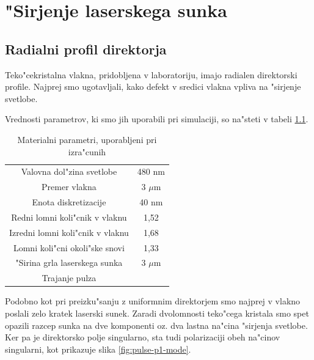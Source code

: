 \documentclass[12pt,twoside,openright,final]{report}
\begin{document}
\chapter{"Sirjenje laserskega sunka}

\section{Radialni profil direktorja}

Teko"cekristalna vlakna, pridobljena v laboratoriju, imajo radialen direktorski profile. 
Najprej smo ugotavljali, kako defekt v sredici vlakna vpliva na "sirjenje svetlobe. 

Vrednosti parametrov, ki smo jih uporabili pri simulaciji, so na"steti v tabeli \ref{tab:parametri}. 

\begin{table}[!htbp]
\centering
 \begin{tabular}{|c|c|}
  \hline
  Valovna dol"zina svetlobe & 480 nm \\
  Premer vlakna & 3 $\mu$m \\
  Enota diskretizacije & 40 nm \\
  \hline
  Redni lomni koli"cnik v vlaknu & 1,52 \\
  Izredni lomni koli"cnik v vlaknu & 1,68 \\
  Lomni koli"cni okoli"ske snovi & 1,33 \\
  \hline
  "Sirina grla laserskega sunka & 3 $\mu$m \\
  Trajanje pulza & \\
  \hline
 \end{tabular}
 \caption{Materialni parametri, uporabljeni pri izra"cunih}
 \label{tab:parametri}
\end{table}

Podobno kot pri preizku"sanju z uniformnim direktorjem smo najprej v vlakno poslali zelo kratek laserski sunek. 
Zaradi dvolomnosti teko"cega kristala smo spet opazili razcep sunka na dve komponenti oz. dva lastna na"cina "sirjenja svetlobe. 
Ker pa je direktorsko polje singularno, sta tudi polarizaciji obeh na"cinov singularni, kot prikazuje slika \ref{fig:pulse-p1-mode}. 
\end{document}

